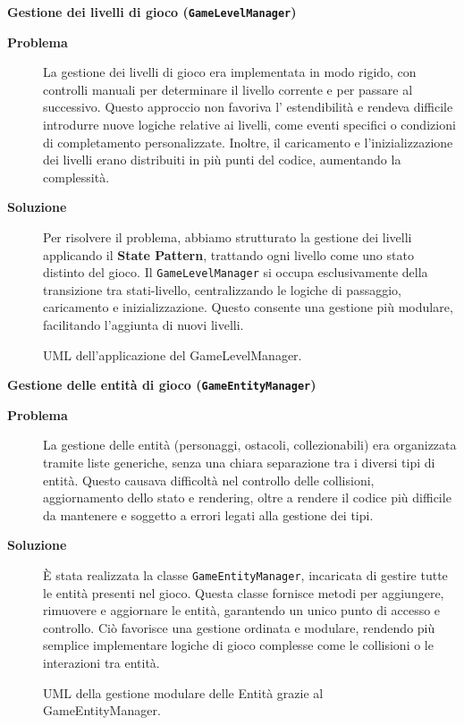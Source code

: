 \documentclass[a4paper,12pt]{report}
\begin{document}
\noindent
\textbf{Gestione dei livelli di gioco (\texttt{GameLevelManager})}
\begin{description}
	\item[\textbf{Problema}]
	      La gestione dei livelli di gioco era implementata in modo rigido, con controlli manuali per determinare il livello corrente e per passare al successivo. Questo approccio non favoriva l'
	      estendibilità e rendeva difficile introdurre nuove logiche relative ai livelli, come eventi specifici o condizioni di completamento personalizzate. Inoltre, il caricamento e l'inizializzazione dei
	      livelli erano distribuiti in più punti del codice, aumentando la complessità.

	\item[\textbf{Soluzione}]
	      Per risolvere il problema, abbiamo strutturato la gestione dei livelli applicando il \textbf{State Pattern}, trattando ogni livello come uno stato distinto del gioco. Il \texttt{GameLevelManager}
	      si occupa esclusivamente della transizione tra stati-livello, centralizzando le logiche di passaggio, caricamento e inizializzazione. Questo consente una gestione più modulare, facilitando
	      l'aggiunta di nuovi livelli.
\end{description}
\begin{figure}[H]
	\centering{}
	
	\caption{UML dell'applicazione del GameLevelManager.}
	\label{img:GameLevelManager}
\end{figure}

\noindent
\textbf{Gestione delle entità di gioco (\texttt{GameEntityManager})}
\begin{description}
	\item[\textbf{Problema}]
	      La gestione delle entità (personaggi, ostacoli, collezionabili) era organizzata tramite liste generiche, senza una chiara separazione tra i diversi tipi di entità. Questo causava
	      difficoltà nel controllo delle collisioni, aggiornamento dello stato e rendering, oltre a rendere il codice più difficile da mantenere e soggetto a errori legati alla gestione dei tipi.

	\item[\textbf{Soluzione}]
	      È stata realizzata la classe \texttt{GameEntityManager}, incaricata di gestire tutte le entità presenti nel gioco. Questa classe fornisce metodi per aggiungere, rimuovere e aggiornare le
	      entità, garantendo un unico punto di accesso e controllo. Ciò favorisce una gestione ordinata e modulare, rendendo più semplice implementare logiche di gioco complesse come le collisioni o
	      le interazioni tra entità.
\end{description}
\begin{figure}[H]
	\centering{}
	
	\caption{UML della gestione modulare delle Entità grazie al GameEntityManager.}
	\label{img:GameEntityManager}
\end{figure}
\end{document}
